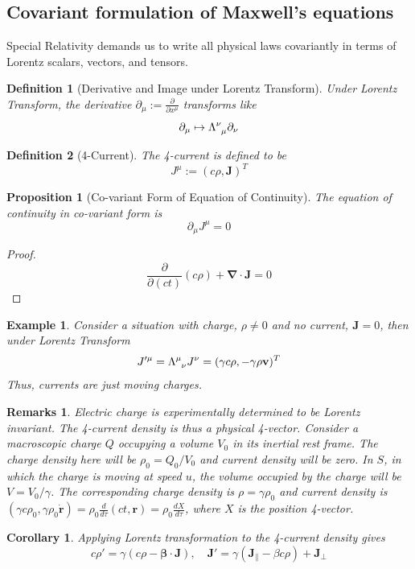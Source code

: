 \documentclass[a4paper]{article}
\newtheorem{remarks}{Remarks}[section]
\newtheorem{eg}{Example}[section]
\theoremstyle{new}
\newtheorem{defi}{Definition}[section]
\newtheorem{prop}{Proposition}[section]
\newtheorem{cor}{Corollary}[section]
\begin{document}
\subsection{Covariant formulation of Maxwell's equations}
Special Relativity demands us to write all physical laws covariantly in terms of Lorentz scalars, vectors, and tensors. 
\begin{defi}[Derivative and Image under Lorentz Transform]
Under Lorentz Transform, the derivative $\partial_\mu:=\frac{\partial}{\partial x^\mu}$ transforms like
$$\partial_\mu\mapsto\tensor*{\Lambda}{*_{}^{\nu}_{\mu}}\partial_\nu$$
\end{defi}
\begin{defi}[4-Current]
The 4-current is defined to be
$$J^\mu:=(c\rho,\mathbf{J})^T$$
\end{defi}
\begin{prop}[Co-variant Form of Equation of Continuity]
The equation of continuity in co-variant form is
$$\partial_\mu J^\mu=0$$
\end{prop}
\begin{proof}
$$\frac{\partial}{\partial(ct)}(c\rho)+\boldsymbol{\nabla}\cdot\mathbf{J}=0$$
\end{proof}
\begin{eg}
Consider a situation with charge, $\rho\neq0$ and no current, $\mathbf{J}=0$, then under Lorentz Transform
$$J'^\mu=\tensor*{\Lambda}{*_{}^{\mu}_{\nu}} J^\nu=(\gamma c\rho,-\gamma\rho\mathbf{v})^T$$
Thus, currents are just moving charges.
\end{eg}
\begin{remarks}
Electric charge is experimentally determined to be Lorentz invariant. The 4-current density is thus a physical 4-vector. Consider a macroscopic charge $Q$ occupying a volume $V_0$ in its inertial rest frame. The charge density here will be $\rho_0=Q_0/V_0$ and current density will be zero. In $S$, in which the charge is moving at speed $u$, the volume occupied by the charge will be $V=V_0/\gamma$. The corresponding charge density is $\rho=\gamma\rho_0$ and current density is $(\gamma c\rho_0,\gamma\rho_0\mathbf{\dot{r}})=\rho_0\frac{d}{d\tau}(ct,\mathbf{r})=\rho_0\frac{dX}{d\tau}$, where $X$ is the position 4-vector.
\end{remarks}
\begin{cor}
Applying Lorentz transformation to the 4-current density gives
$$c\rho'=\gamma(c\rho-\boldsymbol{\beta}\cdot\mathbf{J}),\quad\mathbf{J'}=\gamma(\mathbf{J_\parallel}-\beta c\rho)+\mathbf{J_\perp}$$
\end{cor}
\end{document}
